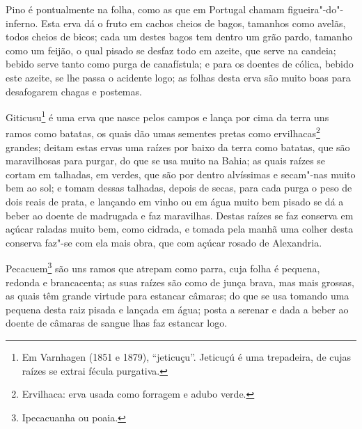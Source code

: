 Pino é pontualmente na folha, como as que em Portugal chamam figueira"-do"-inferno. Esta
erva dá o fruto em cachos cheios de bagos, tamanhos como avelãs, todos cheios de bicos;
cada um destes bagos tem dentro um grão pardo, tamanho como um feijão, o qual pisado se
desfaz todo em azeite, que serve na candeia; bebido serve tanto como purga de canafístula;
e para os doentes de cólica, bebido este azeite, se lhe passa o acidente logo; as folhas
desta erva são muito boas para desafogarem chagas e postemas.

Giticusu\footnote{ Em Varnhagen (1851 e 1879), ``jeticuçu''. Jeticuçú é uma trepadeira, de
cujas raízes se extrai fécula purgativa.} é uma erva que nasce pelos campos e lança por
cima da terra uns ramos como batatas, os quais dão umas sementes pretas como
ervilhacas\footnote{ Ervilhaca: erva usada como forragem e adubo verde.} grandes; deitam
estas ervas uma raízes por baixo da terra como batatas, que são maravilhosas para purgar,
do que se usa muito na Bahia; as quais raízes se cortam em talhadas, em verdes, que são
por dentro alvíssimas e secam"-nas muito bem ao sol; e tomam dessas talhadas, depois de
secas, para cada purga o peso de dois reais de prata, e lançando em vinho ou em água muito
bem pisado se dá a beber ao doente de madrugada e faz maravilhas. Destas raízes se faz
conserva em açúcar raladas muito bem, como cidrada, e tomada pela manhã uma colher desta
conserva faz"-se com ela mais obra, que com açúcar rosado de Alexandria.

Pecacuem\footnote{ Ipecacuanha ou poaia.} são uns ramos que atrepam como parra, cuja folha
é pequena, redonda e brancacenta; as suas raízes são como de junça brava, mas mais
grossas, as quais têm grande virtude para estancar câmaras; do que se usa tomando uma
pequena desta raiz pisada e lançada em água; posta a serenar e dada a beber ao doente de
câmaras de sangue lhas faz estancar logo.

